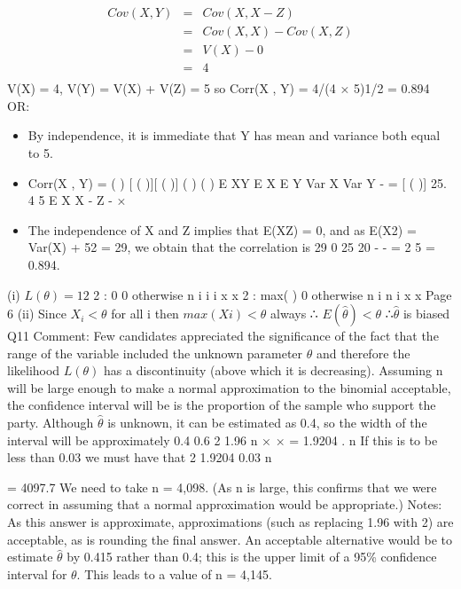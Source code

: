 \documentclass[a4paper,12pt]{article}
\begin{document}
\begin{eqnarray*}
Cov(X , Y) &=& Cov(X , X - Z) \\ &=& Cov(X , X) - Cov(X , Z) \\ &=& V(X) - 0 \\&=& 4\\
\end{eqnarray*}
V(X) = 4, V(Y) = V(X) + V(Z) = 5
so Corr(X , Y) = 4/(4 × 5)1/2 = 0.894
OR:
\begin{itemize}
    \item By independence, it is immediate that Y has mean and variance both equal
to 5.
\item Corr(X , Y) =
( ) [ ( )][ ( )]
( ) ( )
E XY E X E Y
Var X Var Y
- =
[ ( )] 25.
4 5
E X X - Z -
×
\item The independence of X and Z implies that E(XZ) = 0, and as
E(X2) = Var(X) + 52 = 29, we obtain that the correlation is
29 0 25
20
- - =
2
5
= 0.894.
\end{itemize}
 (i) $L(\theta) = 1 2$
2
: 0
0 otherwise
n
i
i i
x
x
2
: max( )
0 otherwise
n
i
n i
x
x
Page 6
(ii) Since $X_i < \theta$ for all i
then $max(Xi) < \theta$ always
∴ $E( \hat{\theta}) < \theta$ ∴$\hat{\theta}$ is biased
Q11 Comment: Few candidates appreciated the significance of the fact that the range of the
variable included the unknown parameter $\theta$ and therefore the likelihood $L(\theta)$ has a
discontinuity (above which it is decreasing).
 Assuming n will be large enough to make a normal approximation to the
binomial acceptable, the confidence interval will be
is the proportion of the sample who support the party.
Although $\hat{\theta}$ is unknown, it can be estimated as 0.4, so the width of the interval
will be approximately
0.4 0.6
2 1.96
n
× × =
1.9204
.
n
If this is to be less than 0.03 we must have that
2 1.9204
0.03
n

= 4097.7
We need to take n = 4,098.
(As n is large, this confirms that we were correct in assuming that a normal
approximation would be appropriate.)
Notes: As this answer is approximate, approximations (such as replacing 1.96
with 2) are acceptable, as is rounding the final answer.
An acceptable alternative would be to estimate $\hat{\theta}$ by 0.415 rather than 0.4; this
is the upper limit of a 95\% confidence interval for $\theta$. This leads to a value of
n = 4,145.
\end{document}

